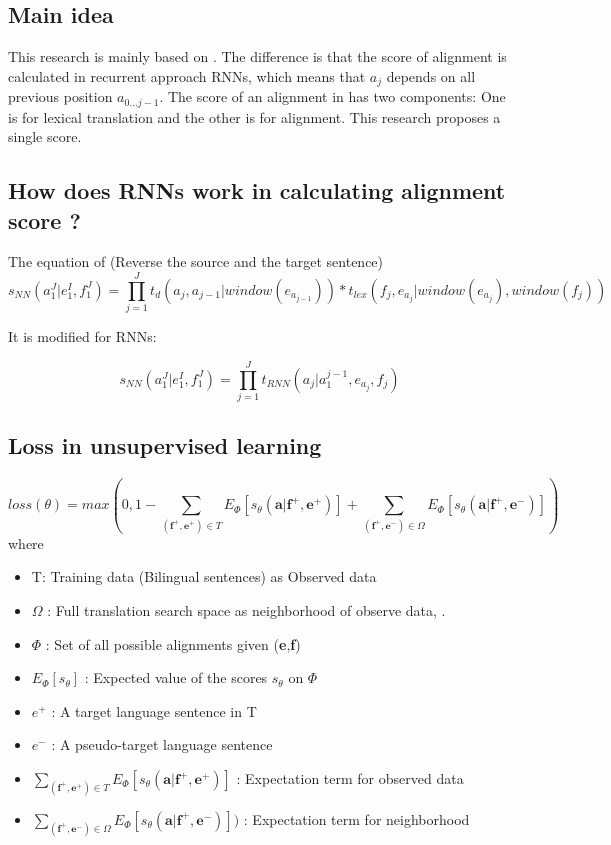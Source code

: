 \documentclass{article}
\begin{document}
\subsection{Main idea}
This research is mainly based on \citep{Yang13word}. The difference is that the score of alignment is calculated in recurrent approach RNNs, which means that $a_j$ depends on all previous position $a_{0...j-1}$.
The score of an alignment in \citep{Yang13word} has two components: One is for lexical translation and the other is for alignment. This research proposes a single score.

\subsection{How does RNNs work in calculating alignment score ?}

The equation of \citep{Yang13word} (Reverse the source and the target sentence)
\begin{equation}
s_{NN}(a_1^ J|e_1^ I, f_1^ J) = \prod_{j = 1}^{J} t_{d}(a_{j},a_{j-1}|window(e_{a_{j-1}})) *t_{lex}(f_{j},e_{a_{j}}|window(e_{a_{j}}), window(f_{j}))
\end{equation}

It is modified for RNNs:

\begin{equation}
s_{NN}(a_1^ J|e_1^ I, f_1^ J) = \prod_{j = 1}^{J} t_{RNN}(a_{j}|a_1^{j-1},e_{a_{j}},f_j  )
\end{equation}

\subsection{Loss in unsupervised learning} 
\begin{equation}
loss(\theta) = max(0 , 1 - \sum_{(\textbf{f}^+,\textbf{e}^+) \in T} E_{\Phi} [s_{\theta} (\textbf{a}|\textbf{f}^+, \textbf{e}^+)]  + \sum_{(\textbf{f}^+,\textbf{e}^-) \in \Omega} E_{\Phi} [s_{\theta} (\textbf{a}|\textbf{f}^+, \textbf{e}^-)] )
\label{Tamura14recurrent Loss Unsupervised Learning}
\end{equation}
where
\begin{itemize}
\item T: Training data (Bilingual sentences) as Observed data
\item $\Omega$ : Full translation search space as neighborhood of observe data, .
\item $\Phi$ : Set of all possible alignments given (\textbf{e},\textbf{f})
\item $E_{\Phi} [s_{\theta}]$ : Expected value of the scores $s_\theta$ on $\Phi$
\item $e^+$ : A target language sentence in T
\item $e^-$ : A pseudo-target language sentence
\item $\sum_{(\textbf{f}^+,\textbf{e}^+) \in T} E_{\Phi} [s_{\theta} (\textbf{a}|\textbf{f}^+, \textbf{e}^+)]$ : Expectation term for observed data
\item$ \sum_{(\textbf{f}^+,\textbf{e}^-) \in \Omega} E_{\Phi} [s_{\theta} (\textbf{a}|\textbf{f}^+, \textbf{e}^-)] )$ : Expectation term for neighborhood
\end{itemize}
\end{document}
